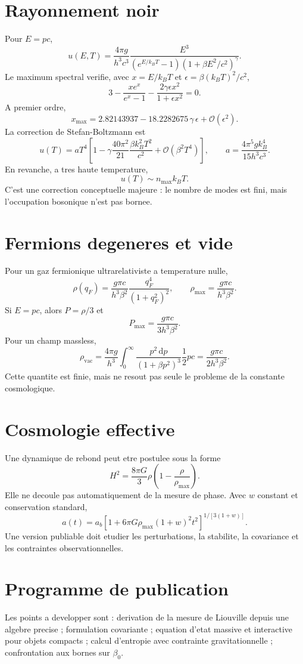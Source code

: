 \documentclass[11pt,a4paper]{article}
\newcommand{\dd}{\mathrm{d}}
\newcommand{\Ocal}{\mathcal{O}}
\begin{document}
\section{Rayonnement noir}
Pour $E=pc$,
\[u(E,T)=\frac{4\pi g}{h^3c^3}\frac{E^3}{(e^{E/k_BT}-1)(1+\beta E^2/c^2)^\gamma}.
\]
Le maximum spectral verifie, avec $x=E/k_BT$ et $\epsilon=\beta(k_BT)^2/c^2$,
\[
3-\frac{x e^x}{e^x-1}-\frac{2\gamma\epsilon x^2}{1+\epsilon x^2}=0.
\]
A premier ordre,
\[
x_{\max}=2.82143937-18.2282675\,\gamma\,\epsilon+\Ocal(\epsilon^2).
\]
La correction de Stefan-Boltzmann est
\[u(T)=aT^4\left[1-\gamma\frac{40\pi^2}{21}\frac{\beta k_B^2T^2}{c^2}+\Ocal(\beta^2T^4)\right],\qquad
 a=\frac{4\pi^5gk_B^4}{15h^3c^3}.
\]
En revanche, a tres haute temperature,
\[u(T)\sim n_{\max}k_BT.
\]
C'est une correction conceptuelle majeure : le nombre de modes est fini, mais l'occupation bosonique n'est pas bornee.

\section{Fermions degeneres et vide}
Pour un gaz fermionique ultrarelativiste a temperature nulle,
\[
\rho(q_F)=\frac{g\pi c}{h^3\beta^2}\frac{q_F^4}{(1+q_F^2)^2},\qquad
\rho_{\max}=\frac{g\pi c}{h^3\beta^2}.
\]
Si $E=pc$, alors $P=\rho/3$ et
\[
P_{\max}=\frac{g\pi c}{3h^3\beta^2}.
\]
Pour un champ massless,
\[
\rho_{\mathrm{vac}}=\frac{4\pi g}{h^3}\int_0^\infty \frac{p^2\,\dd p}{(1+\beta p^2)^3}\frac12 pc
=\frac{g\pi c}{2h^3\beta^2}.
\]
Cette quantite est finie, mais ne resout pas seule le probleme de la constante cosmologique.

\section{Cosmologie effective}
Une dynamique de rebond peut etre postulee sous la forme
\[
H^2=\frac{8\pi G}{3}\rho\left(1-\frac{\rho}{\rho_{\max}}\right).
\]
Elle ne decoule pas automatiquement de la mesure de phase. Avec $w$ constant et conservation standard,
\[
a(t)=a_b\left[1+6\pi G\rho_{\max}(1+w)^2t^2\right]^{1/[3(1+w)]}.
\]
Une version publiable doit etudier les perturbations, la stabilite, la covariance et les contraintes observationnelles.

\section{Programme de publication}
Les points a developper sont : derivation de la mesure de Liouville depuis une algebre precise ; formulation covariante ; equation d'etat massive et interactive pour objets compacts ; calcul d'entropie avec contrainte gravitationnelle ; confrontation aux bornes sur $\beta_0$.
\end{document}
